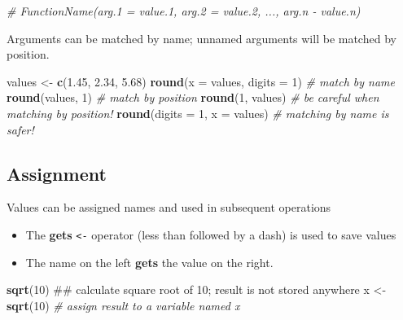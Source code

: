 \documentclass[]{book}
\newenvironment{Shaded}{\begin{snugshade}}{\end{snugshade}}
\newcommand{\KeywordTok}[1]{\textcolor[rgb]{0.13,0.29,0.53}{\textbf{#1}}}
\newcommand{\DataTypeTok}[1]{\textcolor[rgb]{0.13,0.29,0.53}{#1}}
\newcommand{\DecValTok}[1]{\textcolor[rgb]{0.00,0.00,0.81}{#1}}
\newcommand{\FloatTok}[1]{\textcolor[rgb]{0.00,0.00,0.81}{#1}}
\newcommand{\StringTok}[1]{\textcolor[rgb]{0.31,0.60,0.02}{#1}}
\newcommand{\CommentTok}[1]{\textcolor[rgb]{0.56,0.35,0.01}{\textit{#1}}}
\newcommand{\NormalTok}[1]{#1}
\providecommand{\tightlist}{%
  \setlength{\itemsep}{0pt}\setlength{\parskip}{0pt}}
\begin{document}
\begin{Shaded}
\begin{Highlighting}[]
\CommentTok{# FunctionName(arg.1 = value.1, arg.2 = value.2, ..., arg.n - value.n)}
\end{Highlighting}
\end{Shaded}

Arguments can be matched by name; unnamed arguments will be matched by
position.

\begin{Shaded}
\begin{Highlighting}[]
\NormalTok{values <-}\StringTok{ }\KeywordTok{c}\NormalTok{(}\FloatTok{1.45}\NormalTok{, }\FloatTok{2.34}\NormalTok{, }\FloatTok{5.68}\NormalTok{)}
\KeywordTok{round}\NormalTok{(}\DataTypeTok{x =}\NormalTok{ values, }\DataTypeTok{digits =} \DecValTok{1}\NormalTok{) }\CommentTok{# match by name}
\KeywordTok{round}\NormalTok{(values, }\DecValTok{1}\NormalTok{) }\CommentTok{# match by position}
\KeywordTok{round}\NormalTok{(}\DecValTok{1}\NormalTok{, values) }\CommentTok{# be careful when matching by position!}
\KeywordTok{round}\NormalTok{(}\DataTypeTok{digits =} \DecValTok{1}\NormalTok{, }\DataTypeTok{x =}\NormalTok{ values) }\CommentTok{# matching by name is safer!}
\end{Highlighting}
\end{Shaded}

\subsection{Assignment}\label{assignment}

Values can be assigned names and used in subsequent operations

\begin{itemize}
\tightlist
\item
  The \textbf{gets} \texttt{\textless{}-} operator (less than followed
  by a dash) is used to save values
\item
  The name on the left \textbf{gets} the value on the right.
\end{itemize}

\begin{Shaded}
\begin{Highlighting}[]
\KeywordTok{sqrt}\NormalTok{(}\DecValTok{10}\NormalTok{) ## calculate square root of 10; result is not stored anywhere}
\NormalTok{x <-}\StringTok{ }\KeywordTok{sqrt}\NormalTok{(}\DecValTok{10}\NormalTok{) }\CommentTok{# assign result to a variable named x}
\end{Highlighting}
\end{Shaded}
\end{document}
